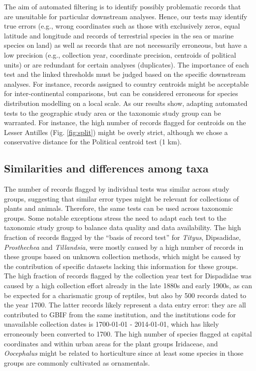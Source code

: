 \documentclass[fleqn,10pt,lineno]{wlpeerj} %
\begin{document}
The aim of automated filtering is to identify possibly problematic records that are unsuitable for particular downstream analyses. Hence, our tests may identify true errors (e.g., wrong coordinates such as those with exclusively zeros, equal latitude and longitude and records of terrestrial species in the sea or marine species on land) as well as records that are not necessarily erroneous, but have a low precision (e.g., collection year, coordinate precision, centroids of political units) or are redundant for certain analyses (duplicates). The importance of each test and the linked thresholds must be judged based on the specific downstream analyses. For instance, records assigned to country centroids might be acceptable for inter-continental comparisons, but can be considered erroneous for species distribution modelling on a local scale. As our results show, adapting automated tests to the geographic study area or the taxonomic study group can be warranted. For instance, the high number of records flagged for centroids on the Lesser Antilles (Fig. \ref{fig:split}) might be overly strict, although we chose a conservative distance for the Political centroid test (1 km).

\hypertarget{similarities-and-differences-among-taxa}{%
\subsection*{Similarities and differences among taxa}\label{similarities-and-differences-among-taxa}}

The number of records flagged by individual tests was similar across study groups, suggesting that similar error types might be relevant for collections of plants and animals. Therefore, the same tests can be used across taxonomic groups. Some notable exceptions stress the need to adapt each test to the taxonomic study group to balance data quality and data availability. The high fraction of records flagged by the ``basis of record test'' for \emph{Tityus}, Dipsadidae, \emph{Prosthechea} and \emph{Tillandsia}, were mostly caused by a high number of records in these groups based on unknown collection methods, which might be caused by the contribution of specific datasets lacking this information for these groups. The high fraction of records flagged by the collection year test for Dispadidae was caused by a high collection effort already in the late 1880s and early 1900s, as can be expected for a charismatic group of reptiles, but also by 500 records dated to the year 1700. The latter records likely represent a data entry error: they are all contributed to GBIF from the same institution, and the institutions code for unavailable collection dates is 1700-01-01 - 2014-01-01, which has likely erroneously been converted to 1700. The high number of species flagged at capital coordinates and within urban areas for the plant groups Iridaceae, and \emph{Oocephalus} might be related to horticulture since at least some species in those groups are commonly cultivated as ornamentals.
\end{document}
